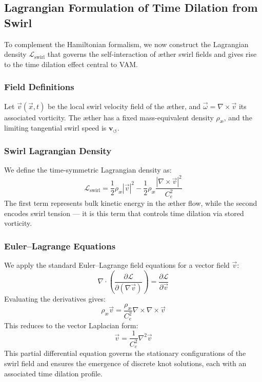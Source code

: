 \documentclass[12pt]{article}
\begin{document}
    \subsection{Lagrangian Formulation of Time Dilation from Swirl}
    \label{subsec:lagrangian_swirl}

    To complement the Hamiltonian formalism, we now construct the Lagrangian density \( \mathcal{L}_{\text{swirl}} \) that governs the self-interaction of æther swirl fields and gives rise to the time dilation effect central to VAM.

    \subsubsection*{Field Definitions}

    Let \( \vec{v}(\vec{x}, t) \) be the local swirl velocity field of the æther, and \( \vec{\omega} = \nabla \times \vec{v} \) its associated vorticity. The æther has a fixed mass-equivalent density \( \rho_\text{\ae} \), and the limiting tangential swirl speed is \( \mathbf{v}_{\scriptscriptstyle\boldsymbol{\circlearrowleft}} \).

    \subsubsection*{Swirl Lagrangian Density}

    We define the time-symmetric Lagrangian density as:
    \begin{equation}
        \mathcal{L}_{\text{swirl}} = \frac{1}{2} \rho_\text{\ae} |\vec{v}|^2 - \frac{1}{2} \rho_\text{\ae} \frac{|\nabla \times \vec{v}|^2}{C_e^2}
    \end{equation}
    The first term represents bulk kinetic energy in the æther flow, while the second encodes swirl tension — it is this term that controls time dilation via stored vorticity.

    \subsubsection*{Euler–Lagrange Equations}

    We apply the standard Euler–Lagrange field equations for a vector field \( \vec{v} \):
    \begin{equation}
        \nabla \cdot \left( \frac{\partial \mathcal{L}}{\partial (\nabla \vec{v})} \right)
        = \frac{\partial \mathcal{L}}{\partial \vec{v}}
    \end{equation}
    Evaluating the derivatives gives:
    \begin{equation}
        \rho_\text{\ae} \vec{v} = \frac{\rho_\text{\ae}}{C_e^2} \nabla \times \nabla \times \vec{v}
    \end{equation}
    This reduces to the vector Laplacian form:
    \begin{equation}
        \boxed{
            \vec{v} = \frac{1}{C_e^2} \nabla^2 \vec{v}
        }
    \end{equation}
    This partial differential equation governs the stationary configurations of the swirl field and ensures the emergence of discrete knot solutions, each with an associated time dilation profile.
\end{document}
